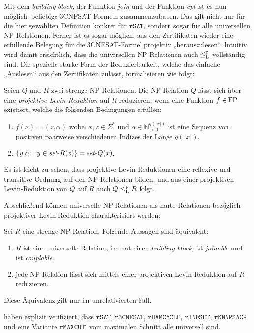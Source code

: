 Mit dem \emph{building block}, der Funktion \emph{join} und der Funktion \emph{cpl} ist es nun möglich, beliebige 3CNFSAT-Formeln zusammenzubauen.
Das gilt nicht nur für die hier gewählten Definition konkret für $\mathtt{rSAT}$, sondern sogar für alle universellen NP-Relationen.
Ferner ist es sogar möglich, aus den Zertifikaten wieder eine erfüllende Belegung für die 3CNFSAT-Formel projektiv „herauszulesen“.
Intuitiv wird damit ersichtlich, dass die universellen NP-Relationen auch $\leq_\mathrm{L}^\mathrm{p}$-vollständig sind.
Die spezielle starke Form der Reduzierbarkeit, welche das einfache „Auslesen“ aus den Zertifikaten zulässt, formalisieren \citeauthor{agrawal_universal_1992} wie folgt:
\begin{definition}
    Seien $Q$ und $R$ zwei strenge NP-Relationen.
    Die NP-Relation $Q$ lässt sich über eine \emph{projektive Levin-Reduktion} auf $R$ reduzieren, wenn eine Funktion $f\in\mathrm{FP}$ existiert, welche die folgenden Bedingungen erfüllen:
    \begin{enumerate}
        \item $f(x)=(z,\alpha)$ wobei $x,z\in\Sigma^*$ und $\alpha\in\mathbb N_{>0}^{q(|x|)}$ ist eine Sequenz von positiven paarweise verschiedenen  Indizes der Länge $q(|x|)$.
        \item $\{ y[\alpha] \mid y\in \mathit{set}\text{-}{}R(z) \} = \mathit{set}\text{-}{}Q(x)$. \qedhere
    \end{enumerate}
\end{definition}
Es ist leicht zu sehen, dass projektive Levin-Reduktionen eine reflexive und transitive Ordnung auf den NP-Relationen bilden, und aus einer projektiven Levin-Reduktion von $Q$ auf $R$ auch $Q\leq_\mathrm{L}^\mathrm{p} R$ folgt. 

Abschließend können universelle NP-Relationen als harte Relationen bezüglich projektiver Levin-Reduktion charakterisiert werden:
\begin{theorem}\label{thm:universal-relations}
    Sei $R$ eine strenge NP-Relation.
    Folgende Aussagen sind äquivalent:
    \begin{enumerate}
        \item $R$ ist eine universelle Relation, i.e.  hat einen \emph{building block}, ist \emph{joinable} und ist \emph{couplable}.
        \item jede NP-Relation lässt sich mittels einer projektiven Levin-Reduktion auf $R$ reduzieren.
    \end{enumerate}
    Diese Äquivalenz gilt nur im unrelativierten Fall.
\end{theorem}
\textcite{agrawal_universal_1992} haben explizit verifiziert, dass $\mathtt{rSAT}$, $\mathtt{r3CNFSAT}$, $\mathtt{rHAMCYCLE}$, $\mathtt{rINDSET}$, $\mathtt{rKNAPSACK}$ und eine Variante $\mathtt{rMAXCUT}'$ vom maximalen Schnitt alle universell sind.

